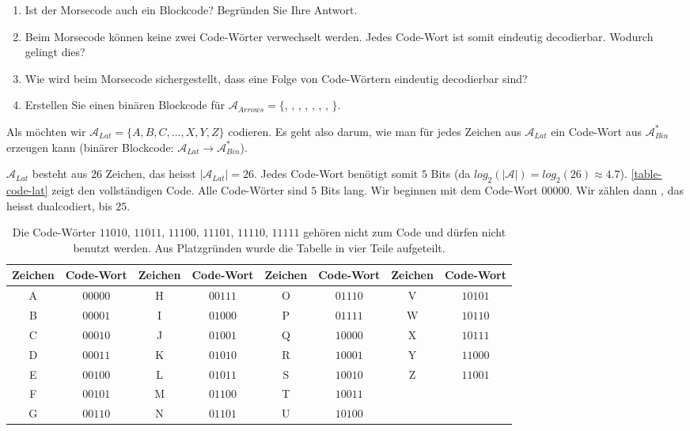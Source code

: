 \begin{enumerate}
\item Ist der Morsecode auch ein Blockcode? Begründen Sie Ihre Antwort.
\item Beim Morsecode können keine zwei Code-Wörter verwechselt werden. Jedes Code-Wort ist somit eindeutig decodierbar. Wodurch gelingt dies?
\item Wie wird beim Morsecode sichergestellt, dass eine Folge von Code-Wörtern eindeutig decodierbar sind?
\item Erstellen Sie einen binären Blockcode für $\mathscr{A}_{Arrows} = \{$\faAngleDoubleDown, \faAngleDoubleLeft, \faAngleDoubleRight, \faAngleDoubleUp, \faAngleDown, \faAngleLeft, \faAngleRight, \faAngleUp $\}$.
\end{enumerate}

\begin{example}
Als  möchten wir $\mathscr{A}_{Lat} = \{A, B, C, \dots, X, Y, Z\}$ codieren. Es geht also darum, wie man für jedes Zeichen aus $\mathscr{A}_{Lat}$ ein Code-Wort aus $\mathscr{A}_{Bin}^*$ erzeugen kann (binärer Blockcode: $\mathscr{A}_{Lat} \rightarrow \mathscr{A}_{Bin}^*$).

$\mathscr{A}_{Lat}$ besteht aus $26$ Zeichen, das heisst $|\mathscr{A}_{Lat}| = 26$. Jedes Code-Wort benötigt somit $5$ Bits (da $log_2(|\mathscr{A}|)=log_2(26)\approx4.7$). \autoref{table-code-lat} zeigt den vollständigen Code. Alle Code-Wörter sind $5$ Bits lang. Wir beginnen mit dem Code-Wort $00000$. Wir zählen dann , das heisst dualcodiert, bis $25$.

\begin{table}[htb]
\centering
\begin{tabular}{|c|c||c|c||c|c||c|c|}
\hline
\footnotesize
\textbf{Zeichen} & \footnotesize \textbf{Code-Wort} & \footnotesize \textbf{Zeichen} & \footnotesize \textbf{Code-Wort} & \footnotesize \textbf{Zeichen} & \footnotesize \textbf{Code-Wort} & \footnotesize \textbf{Zeichen} & \footnotesize \textbf{Code-Wort} \\ \hline
A & $00000$ & H & $00111$ & O & $01110$ & V & $10101$ \\ \hline
B & $00001$ & I & $01000$ & P & $01111$ & W & $10110$ \\ \hline
C & $00010$ & J & $01001$ & Q & $10000$ & X & $10111$ \\ \hline
D & $00011$ & K & $01010$ & R & $10001$ & Y & $11000$ \\ \hline
E & $00100$ & L & $01011$ & S & $10010$ & Z & $11001$ \\ \hline
F & $00101$ & M & $01100$ & T & $10011$ & & \\ \hline
G & $00110$ & N & $01101$ & U & $10100$ & & \\ \hline
\end{tabular}
\caption{Die Code-Wörter $11010$, $11011$, $11100$, $11101$, $11110$, $11111$ gehören nicht zum Code und dürfen nicht benutzt werden. Aus Platzgründen wurde die Tabelle in vier Teile aufgeteilt.}
\label{table-code-lat}
\end{table}

\end{example}

